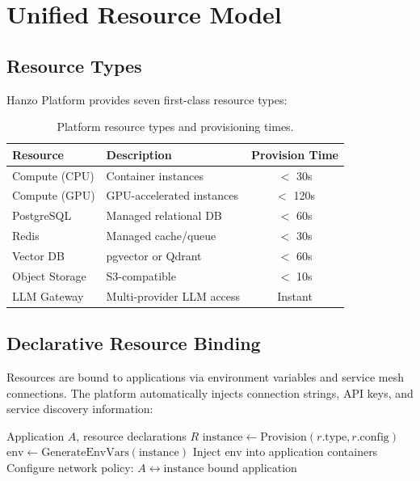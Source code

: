 \documentclass[11pt,twocolumn]{article}
\begin{document}
\section{Unified Resource Model}
\label{sec:resources}

\subsection{Resource Types}

Hanzo Platform provides seven first-class resource types:

\begin{table}[H]
\centering
\small
\begin{tabular}{llc}
\toprule
\textbf{Resource} & \textbf{Description} & \textbf{Provision Time} \\
\midrule
Compute (CPU) & Container instances & $<$ 30s \\
Compute (GPU) & GPU-accelerated instances & $<$ 120s \\
PostgreSQL & Managed relational DB & $<$ 60s \\
Redis & Managed cache/queue & $<$ 30s \\
Vector DB & pgvector or Qdrant & $<$ 60s \\
Object Storage & S3-compatible & $<$ 10s \\
LLM Gateway & Multi-provider LLM access & Instant \\
\bottomrule
\end{tabular}
\caption{Platform resource types and provisioning times.}
\label{tab:resources}
\end{table}

\subsection{Declarative Resource Binding}

Resources are bound to applications via environment variables and service mesh connections. The platform automatically injects connection strings, API keys, and service discovery information:

\begin{algorithm}[H]
\caption{Resource Binding}
\label{alg:binding}
\begin{algorithmic}[1]
\Require Application $A$, resource declarations $R$
    \State $\text{instance} \gets \text{Provision}(r.\text{type}, r.\text{config})$
    \State $\text{env} \gets \text{GenerateEnvVars}(\text{instance})$
    \State Inject $\text{env}$ into application containers
    \State Configure network policy: $A \leftrightarrow \text{instance}$
\EndFor
\State \Return bound application
\end{algorithmic}
\end{algorithm}
\end{document}
